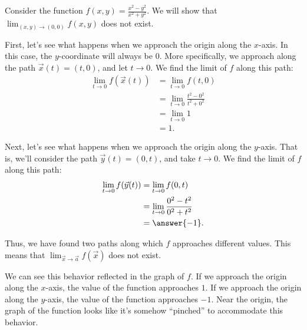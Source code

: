 \documentclass{ximera}
\begin{document}
\begin{example}
Consider the function $f(x,y) = \frac{x^2-y^2}{x^2+y^2}$. We will show that $\lim_{(x,y)\rightarrow(0,0)} f(x,y)$ does not exist.

First, let's see what happens when we approach the origin along the $x$-axis. In this case, the $y$-coordinate will always be $0$. More specifically, we approach along the path $\vec{x}(t) = (t,0)$, and let $t\rightarrow 0$. We find the limit of $f$ along this path:
\begin{align*}
\lim_{t\rightarrow 0}f(\vec{x}(t)) &= \lim_{t\rightarrow 0}f(t,0)\\
&= \lim_{t\rightarrow 0}\frac{t^2-0^2}{t^2+0^2}\\
&= \lim_{t\rightarrow 0}1\\
&= 1.
\end{align*}

Next, let's see what happens when we approach the origin along the $y$-axis. That is, we'll consider the path $\vec{y}(t) = (0,t)$, and take $t\rightarrow 0$. We find the limit of $f$ along this path:
\begin{align*}
\lim_{t\rightarrow 0}f(\vec{y}(t)) &= \lim_{t\rightarrow 0}f(0,t)\\
&= \lim_{t\rightarrow 0}\frac{0^2-t^2}{0^2+t^2}\\
&= \answer{-1}.
\end{align*}

Thus, we have found two paths along which $f$ approaches different values. This means that $\lim_{\vec{x}\rightarrow\vec{a}}f(\vec{x})$ does not exist.

We can see this behavior reflected in the graph of $f$. If we approach the origin along the $x$-axis, the value of the function approaches $1$. If we approach the origin along the $y$-axis, the value of the function approaches $-1$. Near the origin, the graph of the function looks like it's somehow ``pinched'' to accommodate this behavior.

\end{example}
\end{document}
